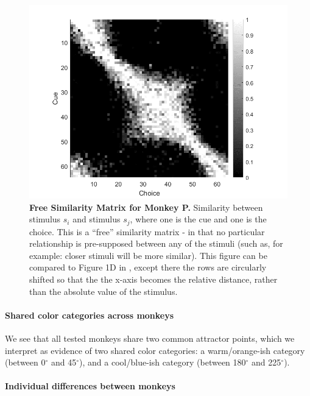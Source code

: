 \begin{figure}
\includegraphics[width=\linewidth]{../../Figures/working/SimilarityMatrixPollux.png}
\caption{\textbf{Free Similarity Matrix for Monkey P.}
Similarity between stimulus $s_i$ and stimulus $s_j$, where one is the cue and one is the choice. This is a ``free'' similarity matrix - in that no particular relationship is pre-supposed between any of the stimuli (such as, for example: closer stimuli will be more similar). This figure can be compared to Figure 1D in \cite{schurgin_psychophysical_2020}, except there the rows are circularly shifted so that the the x-axis becomes the relative distance, rather than the absolute value of the stimulus. %
} 
\label{fig:SimilarityMatrixPollux}
\end{figure}


\paragraph{Shared color categories across monkeys}

We see that all tested monkeys share two common attractor points, which we interpret as evidence of two shared color categories: a warm/orange-ish category (between 0$^\circ$ and 45$^\circ$), and a cool/blue-ish category (between 180$^\circ$ and 225$^\circ$).

\paragraph{Individual differences between monkeys}

